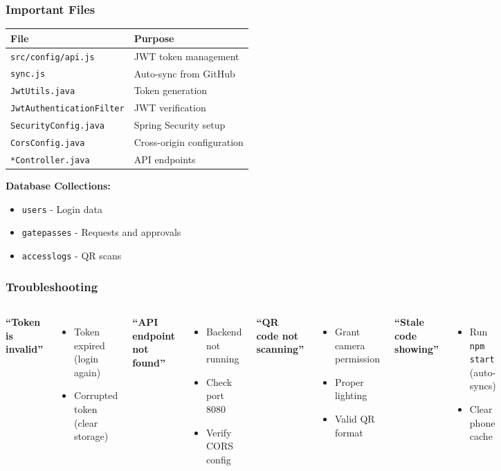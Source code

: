 \documentclass[11pt]{beamer}
\begin{document}
\begin{frame}
\frametitle{Important Files}
\begin{tabular}{|l|l|}
\hline
\textbf{File} & \textbf{Purpose} \\
\hline
\texttt{src/config/api.js} & JWT token management \\
\texttt{sync.js} & Auto-sync from GitHub \\
\texttt{JwtUtils.java} & Token generation \\
\texttt{JwtAuthenticationFilter} & JWT verification \\
\texttt{SecurityConfig.java} & Spring Security setup \\
\texttt{CorsConfig.java} & Cross-origin configuration \\
\texttt{*Controller.java} & API endpoints \\
\hline
\end{tabular}

\vspace{1cm}
\textbf{Database Collections:}
\begin{itemize}
    \item \texttt{users} - Login data
    \item \texttt{gatepasses} - Requests and approvals
    \item \texttt{accesslogs} - QR scans
\end{itemize}
\end{frame}

\begin{frame}
\frametitle{Troubleshooting}
\begin{columns}[T]
\textbf{``Token is invalid''}
\begin{itemize}
    \item Token expired (login again)
    \item Corrupted token (clear storage)
\end{itemize}

\textbf{``API endpoint not found''}
\begin{itemize}
    \item Backend not running
    \item Check port 8080
    \item Verify CORS config
\end{itemize}

\textbf{``QR code not scanning''}
\begin{itemize}
    \item Grant camera permission
    \item Proper lighting
    \item Valid QR format
\end{itemize}

\textbf{``Stale code showing''}
\begin{itemize}
    \item Run \texttt{npm start} (auto-syncs)
    \item Clear phone cache
\end{itemize}
\end{columns}
\end{frame}
\end{document}
